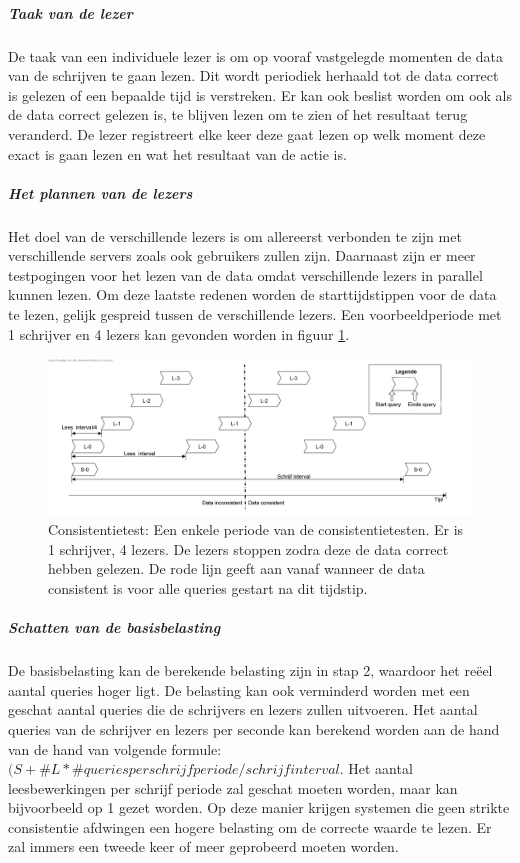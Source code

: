 \subparagraph{Taak van de lezer} De taak van een individuele lezer is om op vooraf vastgelegde momenten de data van de schrijven te gaan lezen. Dit wordt periodiek herhaald tot de data correct is gelezen of een bepaalde tijd is verstreken. Er kan ook beslist worden om ook als de data correct gelezen is, te blijven lezen om te zien of het resultaat terug veranderd. De lezer registreert elke keer deze gaat lezen op welk moment deze exact is gaan lezen en wat het resultaat van de actie is.  

\subparagraph{Het plannen van de lezers} Het doel van de verschillende lezers is om allereerst verbonden te zijn met verschillende servers zoals ook gebruikers zullen zijn. Daarnaast zijn er  meer testpogingen voor het lezen van de data omdat verschillende lezers in parallel kunnen lezen. Om deze laatste redenen worden de starttijdstippen voor de data te lezen, gelijk gespreid tussen de verschillende lezers. Een voorbeeldperiode met 1 schrijver en 4 lezers kan gevonden worden in figuur \ref{fig:test-consistentietest-periode}. 

\begin{figure}[ht!]
\centering
\includegraphics[width=\linewidth]{img/Consistentie-test-periode}
\caption{Consistentietest: Een enkele periode van de consistentietesten. Er is 1 schrijver, 4 lezers. De lezers stoppen zodra deze de data correct hebben gelezen. De rode lijn geeft aan vanaf wanneer de data consistent is voor alle queries gestart na dit tijdstip. }
\label{fig:test-consistentietest-periode}
\end{figure}


\subparagraph{Schatten van de basisbelasting} De basisbelasting kan de berekende belasting zijn in stap 2, waardoor het reëel aantal queries hoger ligt. De belasting kan ook verminderd worden met een geschat aantal queries die de schrijvers en lezers zullen uitvoeren. Het aantal queries van de schrijver en lezers per seconde kan berekend worden aan de hand van de hand van volgende formule: $(S + \#L*\#queriesperschrijfperiode / schrijfinterval$. Het aantal leesbewerkingen per schrijf periode zal geschat moeten worden, maar kan bijvoorbeeld op 1 gezet worden. Op deze manier krijgen systemen die geen strikte consistentie afdwingen een hogere belasting om de correcte waarde te lezen. Er zal immers een tweede keer of meer geprobeerd moeten worden. 

